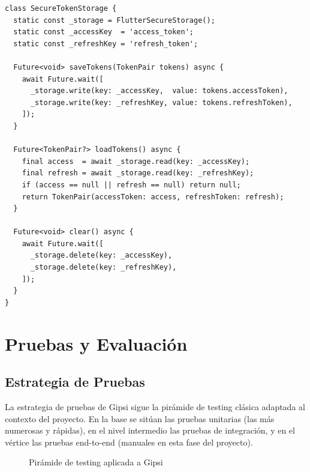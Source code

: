 \documentclass[12pt,a4paper,twoside]{report}
\begin{document}
\begin{lstlisting}[style=dartStyle, caption={Servicio de almacenamiento seguro de tokens}, label={lst:storage}]
class SecureTokenStorage {
  static const _storage = FlutterSecureStorage();
  static const _accessKey  = 'access_token';
  static const _refreshKey = 'refresh_token';

  Future<void> saveTokens(TokenPair tokens) async {
    await Future.wait([
      _storage.write(key: _accessKey,  value: tokens.accessToken),
      _storage.write(key: _refreshKey, value: tokens.refreshToken),
    ]);
  }

  Future<TokenPair?> loadTokens() async {
    final access  = await _storage.read(key: _accessKey);
    final refresh = await _storage.read(key: _refreshKey);
    if (access == null || refresh == null) return null;
    return TokenPair(accessToken: access, refreshToken: refresh);
  }

  Future<void> clear() async {
    await Future.wait([
      _storage.delete(key: _accessKey),
      _storage.delete(key: _refreshKey),
    ]);
  }
}
\end{lstlisting}

\chapter{Pruebas y Evaluación}

\section{Estrategia de Pruebas}

La estrategia de pruebas de Gipsi sigue la pirámide de testing clásica adaptada al contexto del proyecto. En la base se sitúan las pruebas unitarias (las más numerosas y rápidas), en el nivel intermedio las pruebas de integración, y en el vértice las pruebas end-to-end (manuales en esta fase del proyecto).

\begin{figure}[H]
\centering
{}
\caption{Pirámide de testing aplicada a Gipsi}
\label{fig:piramide}
\end{figure}
\end{document}
